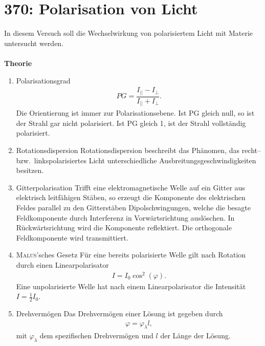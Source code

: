 \section{370: Polarisation von Licht}
In diesem Versuch soll die Wechselwirkung von polarisiertem Licht mit Materie untersucht werden.\\\\
\textbf{Theorie} 
\begin{enumerate}[label=--]
        \item Polarisationsgrad \hspace{25pt}
                \begin{align} 
                        PG=\dfrac{I_{||}-I_\perp}{I_{||}+I_\perp}
                .\end{align} 
                Die Orientierung ist immer zur Polarisationsebene.
                Ist PG gleich null, so ist der Strahl gar nicht polarisiert.
                Ist PG gleich 1, ist der Strahl vollständig polarisiert.
        \item Rotationsdispersion \hspace{25pt} Rotationsdispersion beschreibt das Phänomen, das recht-- bzw.\ linkspolarisiertes Licht unterschiedliche Ausbreitungsgeschwindigkeiten besitzen.
        \item Gitterpolarisation \hspace{25pt} Trifft eine elektromagnetische Welle auf ein Gitter aus elektrisch leitfähigen Stäben, so erzeugt die Komponente des elektrischen Feldes parallel zu den Gitterstäben Dipolschwingungen, welche die besagte Feldkomponente durch Interferenz in Vorwärtsrichtung auslöschen. In Rückwärtsrichtung wird die Komponente reflektiert. Die orthogonale Feldkomponente wird transmittiert.
        \item \textsc{Malus}'sches Gesetz \hspace{25pt} Für eine bereits polarisierte Welle gilt nach Rotation durch einen Linearpolarisator
                \begin{align} 
                        I=I_0\cos ^2\left(\varphi \right)
                .\end{align} 
                Eine unpolarisierte Welle hat nach einem Linearpolarisator die Intensität $I=\tfrac{1}{2}I_0$.
        \item Drehvermögen \hspace{25pt} Das Drehvermögen einer Lösung ist gegeben durch
                \begin{align} 
                        \varphi =\varphi _\lambda l
                ,\end{align} 
                mit $\varphi _\lambda $ dem spezifischen Drehvermögen und $l$ der Länge der Lösung.
\end{enumerate}
